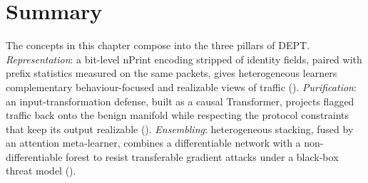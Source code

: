 \section{Summary}\label{sec:bg-summary}
The concepts in this chapter compose into the three pillars of DEPT.
\emph{Representation}: a bit-level nPrint encoding stripped of identity fields, paired with
prefix statistics measured on the same packets, gives heterogeneous learners complementary
behaviour-focused and realizable views of traffic (). \emph{Purification}: an input-transformation defense, built as a
causal Transformer, projects flagged traffic back onto the benign manifold while respecting
the protocol constraints that keep its output realizable
(). \emph{Ensembling}: heterogeneous stacking, fused by
an attention meta-learner, combines a differentiable network with a non-differentiable
forest to resist transferable gradient attacks under a black-box threat model
(). 
